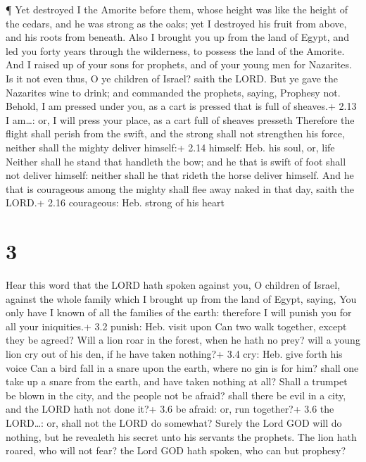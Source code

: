  ¶ Yet destroyed I the Amorite before them, whose height was
like the height of the cedars, and he was strong as the oaks; yet I
destroyed his fruit from above, and his roots from beneath.
 Also I brought you up from the land of Egypt, and led you
forty years through the wilderness, to possess the land of the Amorite.
 And I raised up of your sons for prophets, and of your
young men for Nazarites. Is it not even thus, O ye children of Israel?
saith the LORD.  But ye gave the Nazarites wine to drink;
and commanded the prophets, saying, Prophesy not.  Behold,
I am pressed under you, as a cart is pressed that is full of sheaves.+
2.13 I am\ldots: or, I will press your place, as a cart full of sheaves
presseth  Therefore the flight shall perish from the swift,
and the strong shall not strengthen his force, neither shall the mighty
deliver himself:+ 2.14 himself: Heb. his soul, or, life 
Neither shall he stand that handleth the bow; and he that is swift of
foot shall not deliver himself: neither shall he that rideth the horse
deliver himself.  And he that is courageous among the
mighty shall flee away naked in that day, saith the LORD.+ 2.16
courageous: Heb. strong of his heart

\hypertarget{section-2}{%
\section{3}\label{section-2}}

 Hear this word that the LORD hath spoken against you, O
children of Israel, against the whole family which I brought up from the
land of Egypt, saying,  You only have I known of all the
families of the earth: therefore I will punish you for all your
iniquities.+ 3.2 punish: Heb. visit upon  Can two walk
together, except they be agreed?  Will a lion roar in the
forest, when he hath no prey? will a young lion cry out of his den, if
he have taken nothing?+ 3.4 cry: Heb. give forth his voice 
Can a bird fall in a snare upon the earth, where no gin is for him?
shall one take up a snare from the earth, and have taken nothing at all?
 Shall a trumpet be blown in the city, and the people not be
afraid? shall there be evil in a city, and the LORD hath not done it?+
3.6 be afraid: or, run together?+ 3.6 the LORD\ldots: or, shall not the
LORD do somewhat?  Surely the Lord GOD will do nothing, but
he revealeth his secret unto his servants the prophets.  The
lion hath roared, who will not fear? the Lord GOD hath spoken, who can
but prophesy?


